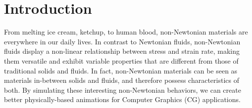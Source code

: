 \documentclass[10pt,journal,compsoc]{IEEEtran}
\begin{document}
\maketitle

\IEEEpeerreviewmaketitle

\IEEEdisplaynontitleabstractindextext






\section{Introduction}


From melting ice cream, ketchup, to human blood, non-Newtonian materials are everywhere in our daily lives. In contrast to Newtonian fluids, non-Newtonian fluids display a non-linear relationship between stress and strain rate, making them versatile and exhibit variable properties that are different from those of traditional solids and fluids. In fact, non-Newtonian materials can be seen as materials in-between solids and fluids, and therefore possess characteristics of both. By simulating these interesting non-Newtonian behaviors, we can create better physically-based animations for Computer Graphics (CG) applications.
\end{document}
